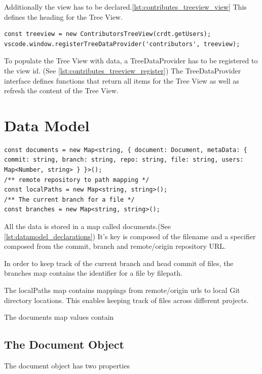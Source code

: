 Additionally the view has to be declared.\autoref{lst:contributes_treeview_view} This defines the heading for the Tree View.

\begin{lstlisting}[label={lst:contributes_treeview_register}, caption=Define Tree View Data Provider]
const treeview = new ContributorsTreeView(crdt.getUsers);
vscode.window.registerTreeDataProvider('contributors', treeview);
\end{lstlisting}

To populate the Tree View with data, a TreeDataProvider has to be registered to the view id. (See \autoref{lst:contributes_treeview_register})
The TreeDataProvider interface defines functions that return all items for the Tree View as well as refresh the content of the Tree View.

\section{Data Model}

\begin{lstlisting}[label={lst:datamodel_declarations}, caption=Data Model Declarations]
const documents = new Map<string, { document: Document, metaData: { commit: string, branch: string, repo: string, file: string, users: Map<Number, string> } }>();
/** remote repository to path mapping */
const localPaths = new Map<string, string>();
/** The current branch for a file */
const branches = new Map<string, string>();
\end{lstlisting}

All the data is stored in a map called documents.(See \autoref{lst:datamodel_declarations})
It's key is composed of the filename and a specifier composed from the commit, branch and remote/origin repository URL.

In order to keep track of the current branch and head commit of files, the branches map contains the identifier for a file by filepath.

The localPaths map contains mappings from remote/origin urls to local Git directory locations.
This enables keeping track of files across different projects.


The documents map values contain

\subsection{The Document Object}

The document object has two properties

